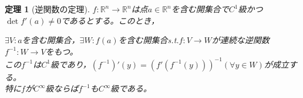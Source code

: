 \documentclass[dvipdfmx,a4j,10pt]{jsarticle}
\theoremstyle{mystyle1}
\newtheorem{thm}[dfn]{定理}
\theoremstyle{mystyle2}
\begin{document}

\begin{framed}
	\begin{thm}[逆関数の定理]\label{th2.11}
$f:\mathbb{R}^n\to\mathbb{R}^n$は点$a\in\mathbb{R}^n$を含む開集合で$C^1$級かつ$\det f'(a)\neq 0$\footnotemark であるとする。このとき，

		$\exists V:a$を含む開集合，$\exists W:f(a)$を含む開集合s.t.$f:V\to W$が連続な逆関数$f^{-1}:W\to V$をもつ。\\
		この$f^{-1}$は$C^1$級であり，$(f^{-1})'(y)=(f'(f^{-1}(y)))^{-1}(\forall y\in W)$が成立する。\\
		特に$f$が$C^\infty$級ならば$f^{-1}$も$C^\infty$級である。
	\end{thm}
\end{framed}

\end{document}
